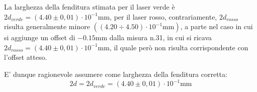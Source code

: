 \documentclass[10pt,twocolumn]{article}
\begin{document}
\noindent La larghezza della fenditura stimata per il laser verde è $2d_{verde} = (4.40 \pm 0,01) \cdot 10^{-1} \text{mm}$, per il laser 
rosso, contrariamente, $2d_{rosso}$ risulta generalmente minore $\left((4.20 \div 4.50 ) \cdot 10^{-1}\text{mm}\right)$, a parte nel caso
in cui si aggiunge un offset di $- 0.15 \text{mm}$ dalla misura n.31, in cui si ricava $2d_{rosso} = (4.40 \pm 0,01) \cdot 10^{-1} \text{mm}$,
il quale però non risulta corrispondente con l'offset atteso.

\noindent E' dunque ragionevole assumere come larghezza della fenditura corretta:
\[
2d = 2d_{verde} = (4.40 \pm 0,01) \cdot 10^{-1} \text{mm}
\]
\end{document}
